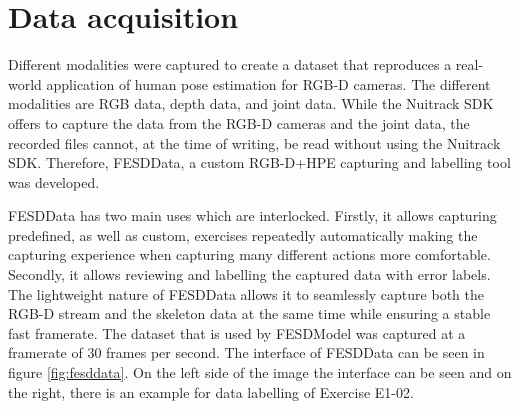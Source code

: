 \section{Data acquisition}
\label{sec:data_acquisition}

Different modalities were captured to create a dataset that reproduces a real-world application of human pose estimation for RGB-D cameras. The different modalities are RGB data, depth data, and joint data. While the Nuitrack SDK offers to capture the data from the RGB-D cameras and the joint data, the recorded files cannot, at the time of writing, be read without using the Nuitrack SDK. Therefore, FESDData, a custom RGB-D+HPE capturing and labelling tool was developed. 

FESDData has two main uses which are interlocked. Firstly, it allows capturing predefined, as well as custom, exercises repeatedly automatically making the capturing experience when capturing many different actions more comfortable. Secondly, it allows reviewing and labelling the captured data with error labels. The lightweight nature of FESDData allows it to seamlessly capture both the RGB-D stream and the skeleton data at the same time while ensuring a stable fast framerate. The dataset that is used by FESDModel was captured at a framerate of 30 frames per second. The interface of FESDData can be seen in figure \ref{fig:fesddata}. On the left side of the image the interface can be seen and on the right, there is an example for data labelling of Exercise E1-02.


